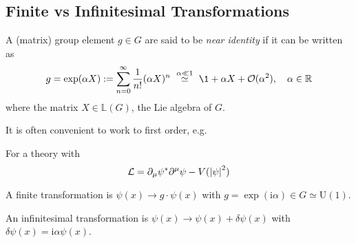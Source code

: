 \documentclass[a4paper,11pt]{article}
\begin{document}
	\subsection{Finite vs Infinitesimal Transformations}

	\begin{defi}
		A (matrix) group element $g \in G$ are said to be \emph{near identity} if it can be written as 
		\[
			g = \exp (\alpha X):= \sum_{n=0}^\infty \frac{1}{n!} (\alpha X)^n\ \stackrel{\alpha \ll 1}{\simeq}\ \1 + \alpha X + \mathcal{O}(\alpha^2), \quad \alpha \in \mathbb{R}
		\]
		where the matrix $X \in \mathbb{L}(G)$, the Lie algebra of $G$.  
	\end{defi}

	It is often convenient to work to first order, e.g.
	\begin{ex}
		For a theory with
		\[
			\mathcal{L} = \partial_\mu \psi^* \partial^\mu \psi - V(\abs{\psi}^2)
		\]

		A finite transformation is $\psi(x) \to g \cdot \psi(x)$ with $g = \exp(\mathrm{i} \alpha) \in G \simeq \mathrm{U}(1)$.
		
		An infinitesimal transformation is $ \psi(x) \to \psi(x) + \delta\psi (x)$ with $\delta \psi(x) = \mathrm{i} \alpha \psi(x)$.
		
	\end{ex}
\end{document}
